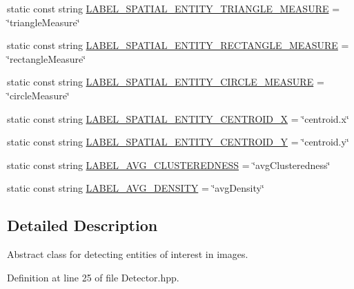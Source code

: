 \begin{DoxyCompactItemize}
\item 
static const string \hyperlink{classmultiscale_1_1analysis_1_1Detector_a7776a488915b9d47f678d87161c0478f}{\-L\-A\-B\-E\-L\-\_\-\-S\-P\-A\-T\-I\-A\-L\-\_\-\-E\-N\-T\-I\-T\-Y\-\_\-\-T\-R\-I\-A\-N\-G\-L\-E\-\_\-\-M\-E\-A\-S\-U\-R\-E} = \char`\"{}triangle\-Measure\char`\"{}
\item 
static const string \hyperlink{classmultiscale_1_1analysis_1_1Detector_acb2040a9a63a40fa4c4ff31af9a574b5}{\-L\-A\-B\-E\-L\-\_\-\-S\-P\-A\-T\-I\-A\-L\-\_\-\-E\-N\-T\-I\-T\-Y\-\_\-\-R\-E\-C\-T\-A\-N\-G\-L\-E\-\_\-\-M\-E\-A\-S\-U\-R\-E} = \char`\"{}rectangle\-Measure\char`\"{}
\item 
static const string \hyperlink{classmultiscale_1_1analysis_1_1Detector_a648197e1a6962d86b2c56a6ae366038a}{\-L\-A\-B\-E\-L\-\_\-\-S\-P\-A\-T\-I\-A\-L\-\_\-\-E\-N\-T\-I\-T\-Y\-\_\-\-C\-I\-R\-C\-L\-E\-\_\-\-M\-E\-A\-S\-U\-R\-E} = \char`\"{}circle\-Measure\char`\"{}
\item 
static const string \hyperlink{classmultiscale_1_1analysis_1_1Detector_a76896a7d2a68a194ed5b4a8fecb85b6c}{\-L\-A\-B\-E\-L\-\_\-\-S\-P\-A\-T\-I\-A\-L\-\_\-\-E\-N\-T\-I\-T\-Y\-\_\-\-C\-E\-N\-T\-R\-O\-I\-D\-\_\-\-X} = \char`\"{}centroid.\-x\char`\"{}
\item 
static const string \hyperlink{classmultiscale_1_1analysis_1_1Detector_a9aff1d4b3d73d4569d21865b8f29d1c2}{\-L\-A\-B\-E\-L\-\_\-\-S\-P\-A\-T\-I\-A\-L\-\_\-\-E\-N\-T\-I\-T\-Y\-\_\-\-C\-E\-N\-T\-R\-O\-I\-D\-\_\-\-Y} = \char`\"{}centroid.\-y\char`\"{}
\item 
static const string \hyperlink{classmultiscale_1_1analysis_1_1Detector_aad3cf21657b51cf81d79103e485ac952}{\-L\-A\-B\-E\-L\-\_\-\-A\-V\-G\-\_\-\-C\-L\-U\-S\-T\-E\-R\-E\-D\-N\-E\-S\-S} = \char`\"{}avg\-Clusteredness\char`\"{}
\item 
static const string \hyperlink{classmultiscale_1_1analysis_1_1Detector_ae3607276ce985a3121088c2611c8bd75}{\-L\-A\-B\-E\-L\-\_\-\-A\-V\-G\-\_\-\-D\-E\-N\-S\-I\-T\-Y} = \char`\"{}avg\-Density\char`\"{}
\end{DoxyCompactItemize}


\subsection{\-Detailed \-Description}
\-Abstract class for detecting entities of interest in images. 

\-Definition at line 25 of file \-Detector.\-hpp.



